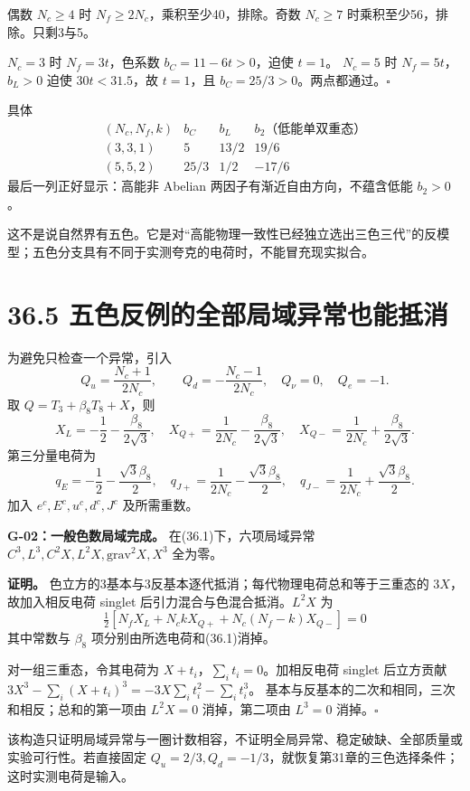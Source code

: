 \documentclass[
  11pt,
  oneside]{book}
\begin{document}
偶数 \(N_c\ge4\) 时 \(N_f\ge2N_c\)，乘积至少40，排除。奇数 \(N_c\ge7\)
时乘积至少56，排除。只剩3与5。

\(N_c=3\) 时 \(N_f=3t\)，色系数 \(b_C=11-6t>0\)，迫使 \(t=1\)。
\(N_c=5\) 时 \(N_f=5t\)，\(b_L>0\) 迫使 \(30t<31.5\)，故 \(t=1\)，且
\(b_C=25/3>0\)。两点都通过。\(\square\)

具体 \[
\begin{array}{c|ccc}
(N_c,N_f,k)&b_C&b_L&b_2\text{（低能单双重态）}\\\hline
(3,3,1)&5&13/2&19/6\\
(5,5,2)&25/3&1/2&-17/6
\end{array}
\tag{36.7}
\] 最后一列正好显示：高能非 Abelian 两因子有渐近自由方向，不蕴含低能
\(b_2>0\)。

这不是说自然界有五色。它是对``高能物理一致性已经独立选出三色三代''的反模型；五色分支具有不同于实测夸克的电荷时，不能冒充现实拟合。

\section{36.5 五色反例的全部局域异常也能抵消}

为避免只检查一个异常，引入 \[
Q_u=\frac{N_c+1}{2N_c},\qquad
Q_d=-\frac{N_c-1}{2N_c},\quad Q_\nu=0,\quad Q_e=-1.
\] 取 \(Q=T_3+\beta_8T_8+X\)，则 \[
X_L=-\frac12-\frac{\beta_8}{2\sqrt3},\quad
X_{Q+}=\frac1{2N_c}-\frac{\beta_8}{2\sqrt3},\quad
X_{Q-}=\frac1{2N_c}+\frac{\beta_8}{2\sqrt3}.
\] 第三分量电荷为 \[
q_E=-\frac12-\frac{\sqrt3\beta_8}{2},\quad
q_{J+}=\frac1{2N_c}-\frac{\sqrt3\beta_8}{2},\quad
q_{J-}=\frac1{2N_c}+\frac{\sqrt3\beta_8}{2}.
\] 加入 \(e^c,E^c,u^c,d^c,J^c\) 及所需重数。

\protect\hypertarget{g-02}{}{}

\textbf{G-02：一般色数局域完成。} 在(36.1)下，六项局域异常
\(C^3,L^3,C^2X,L^2X,\mathrm{grav}^2X,X^3\) 全为零。

\textbf{证明。}
色立方的3基本与3反基本逐代抵消；每代物理电荷总和等于三重态的
\(3X\)，故加入相反电荷 singlet 后引力混合与色混合抵消。\(L^2X\) 为 \[
\tfrac12[N_fX_L+N_c kX_{Q+}+N_c(N_f-k)X_{Q-}]=0
\] 其中常数与 \(\beta_8\) 项分别由所选电荷和(36.1)消掉。

对一组三重态，令其电荷为 \(X+t_i\)，\(\sum_i t_i=0\)。加相反电荷 singlet
后立方贡献 \(3X^3-\sum_i(X+t_i)^3=-3X\sum_i t_i^2-\sum_i t_i^3\)。
基本与反基本的二次和相同，三次和相反；总和的第一项由 \(L^2X=0\)
消掉，第二项由 \(L^3=0\) 消掉。\(\square\)

该构造只证明局域异常与一圈计数相容，不证明全局异常、稳定破缺、全部质量或实验可行性。若直接固定
\(Q_u=2/3,Q_d=-1/3\)，就恢复第31章的三色选择条件；这时实测电荷是输入。
\end{document}
